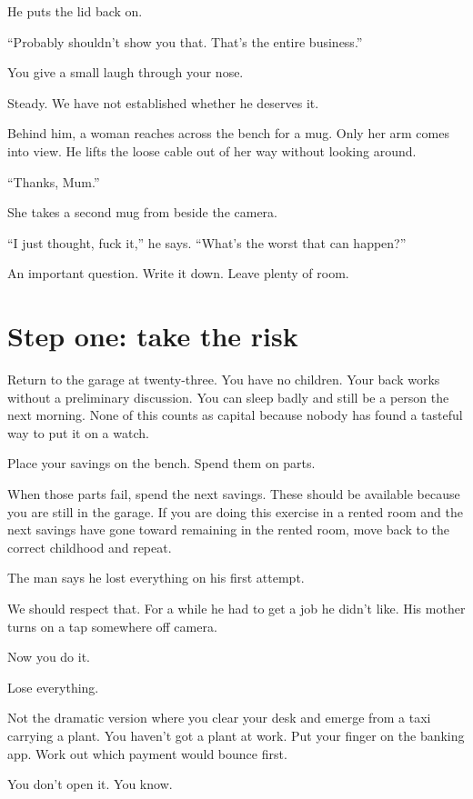 \documentclass[11pt,oneside]{book}
\begin{document}
He puts the lid back on.

``Probably shouldn't show you that. That's the entire business.''

You give a small laugh through your nose.

Steady. We have not established whether he deserves it.

Behind him, a woman reaches across the bench for a mug. Only her arm comes into view. He lifts the loose cable out of her way without looking around.

``Thanks, Mum.''

She takes a second mug from beside the camera.

``I just thought, fuck it,'' he says. ``What's the worst that can happen?''

An important question. Write it down. Leave plenty of room.

\section*{Step one: take the risk}

Return to the garage at twenty-three. You have no children. Your back works without a preliminary discussion. You can sleep badly and still be a person the next morning. None of this counts as capital because nobody has found a tasteful way to put it on a watch.

Place your savings on the bench. Spend them on parts.

When those parts fail, spend the next savings. These should be available because you are still in the garage. If you are doing this exercise in a rented room and the next savings have gone toward remaining in the rented room, move back to the correct childhood and repeat.

The man says he lost everything on his first attempt.

We should respect that. For a while he had to get a job he didn't like. His mother turns on a tap somewhere off camera.

Now you do it.

Lose everything.

Not the dramatic version where you clear your desk and emerge from a taxi carrying a plant. You haven't got a plant at work. Put your finger on the banking app. Work out which payment would bounce first.

You don't open it. You know.
\end{document}
